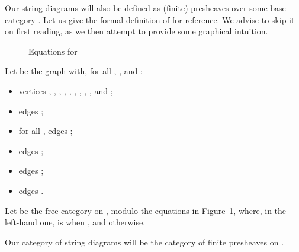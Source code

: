 \documentclass{LMCS}
\theoremstyle{plain}\newtheorem{satz}[thm]{Satz}
\begin{document}
Our string diagrams will also be defined as (finite) presheaves over
some base category . Let us give the formal definition of  for
reference.  We advise to skip it on first reading, as we then attempt
to provide some graphical intuition.
\begin{figure}[t]
    \caption{Equations for }
  \label{fig:equationsC}
\end{figure}

\begin{defi}
Let  be the graph with, for all , , and :
  \begin{itemize}
  \item vertices , , , , ,
    , , , , and ;
  \item edges ;
  \item for all , edges
    ;
  \item edges ;
  \item edges ;
  \item edges .
  \end{itemize}

  Let  be the free category on , modulo the equations in
  Figure~\ref{fig:equationsC}, where, in the left-hand one,  is 
  when , and  otherwise.
\end{defi}
Our category of string diagrams will be the category  of finite
presheaves on .
\end{document}
